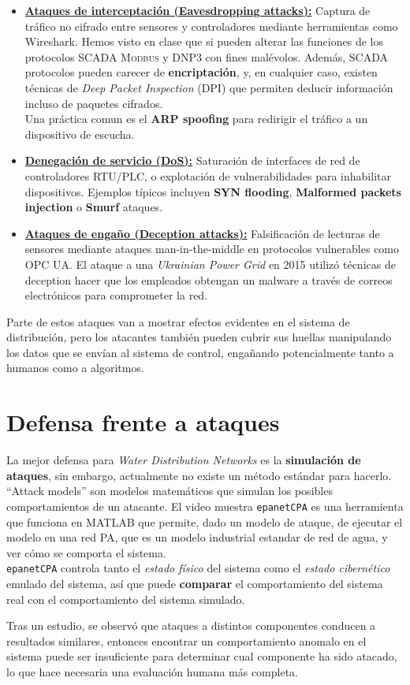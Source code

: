 \begin{itemize}
   \item \textbf{\ul{Ataques de interceptación (Eavesdropping attacks):}} Captura de tráfico no cifrado entre sensores y controladores mediante herramientas como Wireshark. Hemos visto en clase que si pueden {alterar las funciones} de los protocolos \textsc{SCADA} \textsc{Modbus} y \textsc{DNP3} con fines malévolos. Además, \textsc{SCADA} protocolos pueden carecer de \textbf{encriptación}, y, en cualquier caso, existen técnicas de \textit{Deep Packet Inspection} (\textsc{}DPI) que permiten deducir información incluso de paquetes cifrados.\\
   Una práctica comun es el \textbf{ARP spoofing} para redirigir el tráfico a un dispositivo de escucha.
   
   \item \textbf{\ul{Denegación de servicio (DoS):}} Saturación de interfaces de red de controladores RTU/PLC, o explotación de vulnerabilidades para inhabilitar dispositivos. Ejemplos típicos incluyen \textbf{\textsc{SYN} flooding}, \textbf{Malformed packets injection} o \textbf{Smurf} ataques.
   
   \item \textbf{\ul{Ataques de engaño (Deception attacks):}} Falsificación de lecturas de sensores mediante ataques man-in-the-middle en protocolos vulnerables como OPC UA. El ataque a una \textit{Ukrainian Power Grid} en 2015 utilizó técnicas de deception hacer que los empleados obtengan un malware a través de correos electrónicos para comprometer la red.
\end{itemize}

Parte de estos ataques van a mostrar efectos evidentes en el sistema de distribución, pero los atacantes también pueden cubrir sus huellas manipulando los datos que se envían al sistema de control, engañando potencialmente tanto a humanos como a algoritmos.

\section{Defensa frente a ataques}
La mejor defensa para \textit{Water Distribution Networks} es la \textbf{simulación de ataques}, sin embargo, actualmente no existe un método estándar para hacerlo.\\
``Attack models'' son modelos matemáticos que simulan los posibles comportamientos de un atacante.
El video muestra \texttt{epanetCPA} es una herramienta que funciona en MATLAB que permite, dado un modelo de ataque, de ejecutar el modelo en una red PA, que es un modelo industrial estandar de red de agua, y ver cómo se comporta el sistema.\\
\texttt{epanetCPA} controla tanto el \textit{estado físico} del sistema como el \textit{estado cibernético} emulado del sistema, así que puede \textbf{comparar} el comportamiento del sistema real con el comportamiento del sistema simulado.

Tras un estudio, se observó que ataques a distintos componentes conducen a resultados similares, entonces encontrar un comportamiento anomalo en el sistema puede ser insuficiente para determinar cual componente ha sido atacado, lo que hace necesaria una evaluación humana más completa.